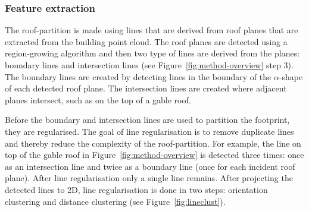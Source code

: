 \subsubsection{Feature extraction}
The roof-partition is made using lines that are derived from roof planes that are extracted from the building point cloud.
The roof planes are detected using a region-growing algorithm and then two type of lines are derived from the planes: boundary lines and intersection lines (see Figure~\ref{fig:method-overview} step 3).
The boundary lines are created by detecting lines in the boundary of the $\alpha$-shape of each detected roof plane.
The intersection lines are created where adjacent planes intersect, such as on the top of a gable roof.

Before the boundary and intersection lines are used to partition the footprint, they are regularised.
The goal of line regularisation is to remove duplicate lines and thereby reduce the complexity of the roof-partition.
For example, the line on top of the gable roof in Figure~\ref{fig:method-overview} is detected three times: once as an intersection line and twice as a boundary line (once for each incident roof plane).
After line regularisation only a single line remains.
After projecting the detected lines to 2D, line regularisation is done in two steps: orientation clustering and distance clustering (see Figure~\ref{fig:lineclust}).

